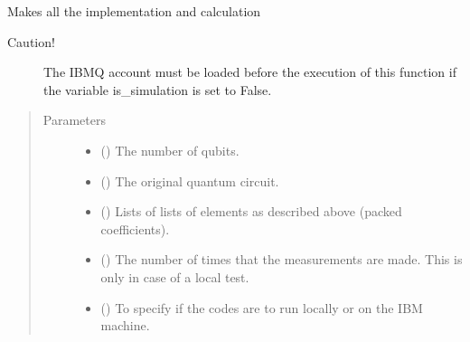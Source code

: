 \documentclass[letterpaper,10pt,english]{sphinxmanual}
\begin{document}
\begin{fulllineitems}
\label{\detokenize{evaluation:mermin_on_qiskit.evaluation.evaluate_polynomial}}
Makes all the implementation and calculation
\begin{description}
\item[{Caution!}] \leavevmode{[}{]}
The IBMQ account must be loaded before the execution of this 
function if the variable is\_simulation is set to False.

\end{description}
\begin{quote}\begin{description}
\item[{Parameters}] \leavevmode\begin{itemize}
\item {} 
 () \textendash{} The number of qubits.

\item {} 
 () \textendash{} The original quantum circuit.

\item {} 
 (\sphinxstyleliteralemphasis{\sphinxupquote{{[}}}\sphinxstyleliteralemphasis{\sphinxupquote{{[}}}\sphinxstyleliteralemphasis{\sphinxupquote{{]}}}\sphinxstyleliteralemphasis{\sphinxupquote{{]}}}) \textendash{} Lists of lists of elements as described 
above (packed coefficients).

\item {} 
 () \textendash{} The number of times that the measurements are made. This 
is only in case of a local test.

\item {} 
 () \textendash{} To specify if the codes are to run locally or 
on the IBM machine.


\end{itemize}
\end{description}
\end{quote}
\end{fulllineitems}
\end{document}
